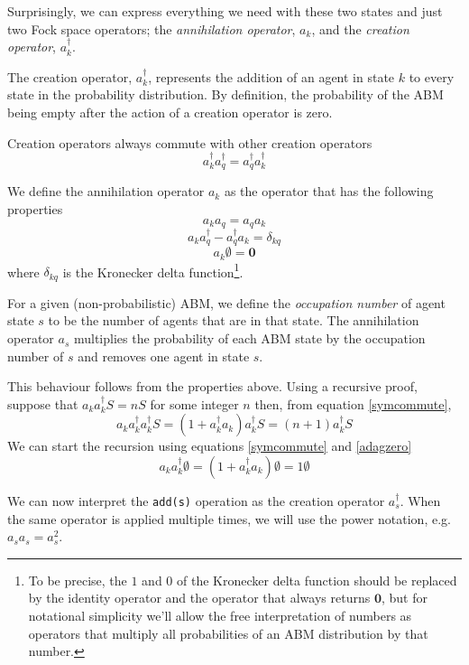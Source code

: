 \documentclass[letterpaper,twocolumn,10pt]{article}
\begin{document}
Surprisingly, we can express everything we need with these two states and just two Fock space operators; the \textit{annihilation operator}, $a_k$, and the \textit{creation operator}, $a_k^\dag$.

The creation operator, $a_k^\dag$, represents the addition of an agent in state $k$ to every state in the probability distribution. By definition, the probability of the ABM being empty after the action of a creation operator is zero.

Creation operators always commute with other creation operators
\begin{equation}
a_k^\dag a_q^\dag = a_q^\dag a_k^\dag
\label{acommute}
\end{equation}

We define the annihilation operator $a_k$ as the operator that has the following properties
\begin{equation}
a_k a_q = a_q a_k
\label{ccommute}
\end{equation}
\begin{equation}
a_k a_q^\dag - a_q^\dag a_k = \delta_{kq}
\label{symcommute}
\end{equation}
\begin{equation}
a_k\emptyset = \mathbf{0}
\label{adagzero} 
\end{equation}
where $\delta_{kq}$ is the Kronecker delta function\footnote{To be precise, the $1$ and $0$ of the Kronecker delta function should be replaced by the identity operator and the operator that always returns $\mathbf{0}$, but for notational simplicity we'll allow the free interpretation of numbers as operators that multiply all probabilities of an ABM distribution by that number.}.

For a given (non-probabilistic) ABM, we define the \textit{occupation number} of agent state $s$ to be the number of agents that are in that state. The annihilation operator $a_s$ multiplies the probability of each ABM state by the occupation number of $s$ and removes one agent in state $s$.

This behaviour follows from the properties above. Using a recursive proof, suppose that $a_k a_k^\dag S = nS$ for some integer $n$ then, from equation \ref{symcommute},
\[
a_k a_k^\dag a_k^\dag S = (1 + a_k^\dag a_k)a_k^\dag S = (n+1)a_k^\dag S
\]
We can start the recursion using equations \ref{symcommute} and \ref{adagzero}
\[
a_k a_k^\dag \emptyset = (1 + a_k^\dag a_k)\emptyset = 1\emptyset
\]

We can now interpret the \texttt{add(s)} operation as the creation operator $a^\dag_s$. When the same operator is applied multiple times, we will use the power notation, e.g. $a_s a_s = a^2_s$.
\end{document}
